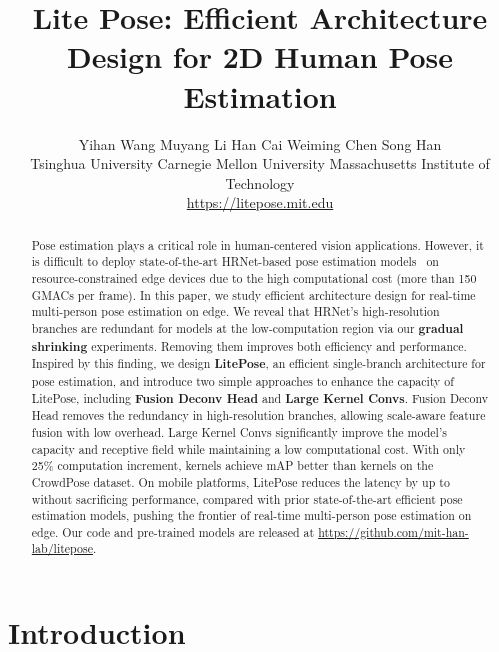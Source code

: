 \documentclass[10pt,twocolumn,letterpaper]{article}
\begin{document}
\def\multirowcenter{-0.5\dimexpr \aboverulesep + \belowrulesep + \cmidrulewidth}
\renewcommand{\thefootnote}{\number\value{footnote}}

\newcommand\blfootnotetext[1]{\begingroup
  \renewcommand\thefootnote{}\footnotetext{#1}\endgroup
}

\title{Lite Pose: Efficient Architecture Design for 2D Human Pose Estimation}

\author{
Yihan Wang
\qquad 
Muyang Li
\qquad
Han Cai
\qquad
Weiming Chen
\qquad
Song Han \\
\small{
Tsinghua University \quad Carnegie Mellon University \quad Massachusetts Institute of Technology }\\
\url{https://litepose.mit.edu}
}
\maketitle

\blfootnotetext{ work done while interning at MIT HAN Lab}

\begin{abstract}
Pose estimation plays a critical role in human-centered vision applications. However, it is difficult to deploy state-of-the-art HRNet-based pose estimation models~\cite{cheng2020higherhrnet} on resource-constrained edge devices due to the high computational cost (more than 150 GMACs per frame). In this paper, we study efficient architecture design for real-time multi-person pose estimation on edge. We reveal that HRNet's high-resolution branches are redundant for models at the low-computation region via our \textbf{gradual shrinking} experiments. Removing them improves both efficiency and performance. Inspired by this finding, we design \textbf{LitePose}, an efficient single-branch architecture for pose estimation, and introduce two simple approaches to enhance the capacity of LitePose, including 
\textbf{Fusion Deconv Head} and \textbf{Large Kernel Convs}. Fusion Deconv Head  removes the redundancy in high-resolution branches, allowing scale-aware feature fusion with low overhead. Large Kernel Convs significantly improve the model's capacity and receptive field while maintaining a low computational cost. With only 25\% computation increment,  kernels achieve  mAP better than  kernels on the CrowdPose dataset. On mobile platforms, LitePose reduces the latency by up to  without sacrificing performance, compared with prior state-of-the-art efficient pose estimation models, pushing the frontier of real-time multi-person pose estimation on edge. 
Our code and pre-trained models are released at \url{https://github.com/mit-han-lab/litepose}.
\end{abstract} \section{Introduction}
\end{document}
